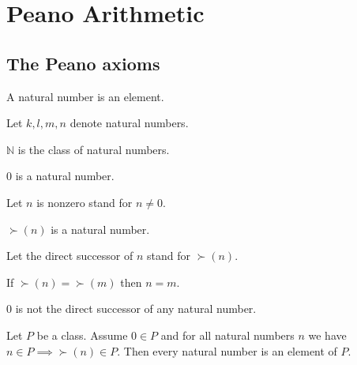 \documentclass[../../natural-numbers.ftl.tex]{subfiles}
\begin{document}
  \section{Peano Arithmetic}

  \begin{forthel}
  \end{forthel}

  \begin{forthel}
  \end{forthel}


  \subsection{The Peano axioms}

  \begin{forthel}
    \begin{signature}
      A natural number is an element.
    \end{signature}

    Let $k,l,m,n$ denote natural numbers.

    \begin{definition}
      $\mathbb{N}$ is the class of natural numbers.
    \end{definition}

    \begin{signature}
      $0$ is a natural number.
    \end{signature}

    Let $n$ is nonzero stand for $n \neq 0$.

    \begin{signature}
      $\succ(n)$ is a natural number.
    \end{signature}

    Let the direct successor of $n$ stand for $\succ(n)$.

    \begin{axiom}\label{Arithmetic_01_01_011520}
      If $\succ(n) = \succ(m)$ then $n = m$.
    \end{axiom}

    \begin{axiom}\label{Arithmetic_01_01_795282}
      $0$ is not the direct successor of any natural number.
    \end{axiom}

    \begin{axiom}\label{Arithmetic_01_01_350822}
      Let $P$ be a class.
      Assume $0 \in P$ and for all natural numbers $n$ we have $n \in P \implies \succ(n) \in P$.
      Then every natural number is an element of $P$.
    \end{axiom}
  \end{forthel}
\end{document}
